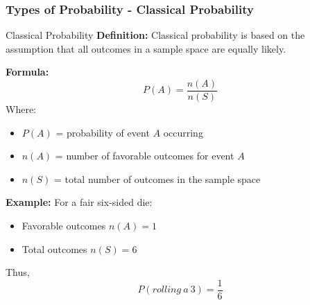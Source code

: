 \documentclass[aspectratio=169]{beamer}
\begin{document}
\begin{frame}[fragile]
    \frametitle{Types of Probability - Classical Probability}
    \begin{block}{Classical Probability}
        \textbf{Definition:} Classical probability is based on the assumption that all outcomes in a sample space are equally likely. 

        \textbf{Formula:}
        \begin{equation}
            P(A) = \frac{n(A)}{n(S)}
        \end{equation}
        Where:
        \begin{itemize}
            \item \( P(A) \) = probability of event \( A \) occurring
            \item \( n(A) \) = number of favorable outcomes for event \( A \)
            \item \( n(S) \) = total number of outcomes in the sample space
        \end{itemize}
        
        \textbf{Example:} For a fair six-sided die:
        \begin{itemize}
            \item Favorable outcomes \( n(A) = 1 \)
            \item Total outcomes \( n(S) = 6 \)
        \end{itemize}
        Thus, 
        \begin{equation}
            P(rolling\ a\ 3) = \frac{1}{6}
        \end{equation}
    \end{block}
\end{frame}
\end{document}
